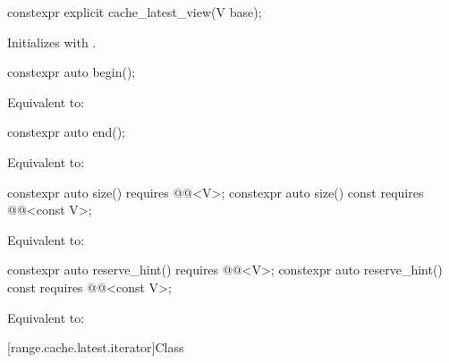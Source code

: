 %
\begin{itemdecl}
constexpr explicit cache_latest_view(V base);
\end{itemdecl}

\begin{itemdescr}
\pnum
\effects
Initializes  with .
\end{itemdescr}

%
\begin{itemdecl}
constexpr auto begin();
\end{itemdecl}

\begin{itemdescr}
\pnum
\effects
Equivalent to: 
\end{itemdescr}

%
\begin{itemdecl}
constexpr auto end();
\end{itemdecl}

\begin{itemdescr}
\pnum
\effects
Equivalent to: 
\end{itemdescr}

%
\begin{itemdecl}
constexpr auto size() requires @@<V>;
constexpr auto size() const requires @@<const V>;
\end{itemdecl}

\begin{itemdescr}
\pnum
\effects
Equivalent to: 
\end{itemdescr}

%
\begin{itemdecl}
constexpr auto reserve_hint() requires @@<V>;
constexpr auto reserve_hint() const requires @@<const V>;
\end{itemdecl}

\begin{itemdescr}
\pnum
\effects
Equivalent to: 
\end{itemdescr}

[range.cache.latest.iterator]{Class }


